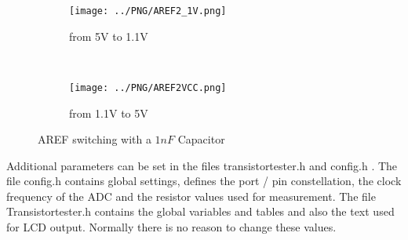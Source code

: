 \begin{figure}[H]
  \begin{subfigure}[b]{8.6cm}
    \centering
    \texttt{[image: ../PNG/AREF2\_1V.png]}
    \caption{from 5V to 1.1V }
    \label{pic:aref1}
  \end{subfigure}
  ~
  \begin{subfigure}[b]{8.6cm}
    \centering
    \texttt{[image: ../PNG/AREF2VCC.png]}
    \caption{from 1.1V to 5V}
    \label{pic:aref5}
  \end{subfigure}
  \caption{AREF switching with a \(1nF\) Capacitor}
\end{figure}


Additional parameters can be set in the files transistortester.h and config.h .
The file config.h contains global settings, defines the port / pin constellation,
 the clock frequency of the ADC and the resistor values used for measurement.
The file Transistortester.h contains the global variables and tables and also the text used for LCD output.
Normally there is no reason to change these values.
